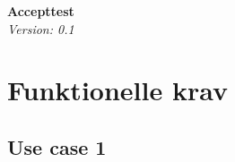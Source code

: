 



		\begin{center}
			\Large\textbf{Accepttest}\\
			\large\textit{Version: 0.1} \linebreak \vspace{3cm}
		
		\end{center}
	

	\newpage
	\tableofcontents
	\newpage
	
	\section{Funktionelle krav}
		
	\subsection{Use case 1}
